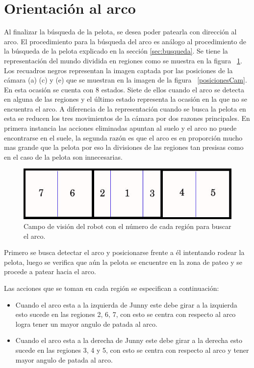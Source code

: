 \section{Orientaci\'on al arco}

Al finalizar la búsqueda de la pelota, se desea poder patearla con dirección al arco. El procedimiento para la búsqueda del arco es an\'alogo al procedimiento de la b\'usqueda de la pelota explicado en la sección \ref{sec:busqueda}.
Se tiene la representación del mundo dividida en regiones como se muestra en la figura ~\ref{divisionCamArco}. Los recuadros negros representan la imagen captada por las posiciones de la cámara (a) (c) y (e) que se muestran en la imagen de la figura ~\ref{posicionesCam}. En esta ocasi\'on se cuenta con 8 estados. Siete de ellos cuando el arco se detecta en alguna de las regiones y el último estado representa la ocasión en la que no se encuentra el arco. 
A diferencia de la representaci\'on cuando se busca la pelota en esta se reducen los tres movimientos de la c\'amara por dos razones principales. En primera instancia las acciones eliminadas apuntan al suelo y el arco no puede encontrarse en el suele, la segunda raz\'on es que el arco es en proporci\'on mucho mas grande que la pelota por eso la divisiones de las regiones tan presisas como en el caso de la pelota son innecesarias.
\begin{figure}[hbtp]
\centering
\includegraphics[scale=0.5]{imagenes/RegionesArco.jpg}
\caption{Campo de visión del robot con el número de cada región para buscar el arco. }
\label{divisionCamArco}
\end{figure}

Primero se busca detectar el arco y posicionarse frente a él intentando rodear la pelota, luego se verifica que a\'un la pelota se encuentre en la zona de pateo y se procede a patear hacia el arco.

Las acciones que se toman en cada regi\'on se especifican a continuación: 
 \begin{itemize}

\item Cuando el arco esta a la izquierda de Junny este debe girar a la izquierda esto sucede en las regiones 2, 6, 7, con esto se centra con respecto al arco logra tener un mayor angulo de patada al arco.

\item Cuando el arco esta a la derecha de Junny este debe girar a la derecha esto sucede en las regiones 3, 4 y 5, con esto se centra con respecto al arco y tener mayor angulo de patada al arco.


\end{itemize}

